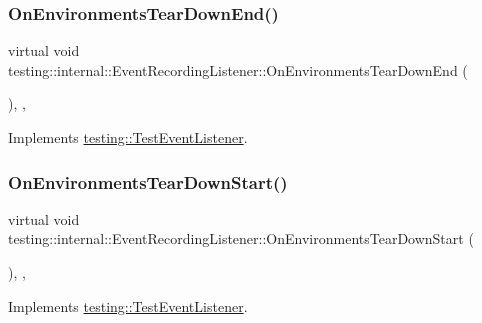 \subsubsection{\texorpdfstring{OnEnvironmentsTearDownEnd()}{OnEnvironmentsTearDownEnd()}}
{\footnotesize\ttfamily virtual void testing\+::internal\+::\+Event\+Recording\+Listener\+::\+On\+Environments\+Tear\+Down\+End (\begin{DoxyParamCaption}\item[{const \mbox{\hyperlink{classtesting_1_1UnitTest}{Unit\+Test}} \&}]{ }\end{DoxyParamCaption})\hspace{0.3cm}{\ttfamily [inline]}, {\ttfamily [protected]}, {\ttfamily [virtual]}}



Implements \mbox{\hyperlink{classtesting_1_1TestEventListener_a9ea04fa7f447865ba76df35e12ba2092}{testing\+::\+Test\+Event\+Listener}}.

\mbox{\label{classtesting_1_1internal_1_1EventRecordingListener_a17eebd7bb5cc6bab53b20794919ca5ae}} 
\subsubsection{\texorpdfstring{OnEnvironmentsTearDownStart()}{OnEnvironmentsTearDownStart()}}
{\footnotesize\ttfamily virtual void testing\+::internal\+::\+Event\+Recording\+Listener\+::\+On\+Environments\+Tear\+Down\+Start (\begin{DoxyParamCaption}\item[{const \mbox{\hyperlink{classtesting_1_1UnitTest}{Unit\+Test}} \&}]{ }\end{DoxyParamCaption})\hspace{0.3cm}{\ttfamily [inline]}, {\ttfamily [protected]}, {\ttfamily [virtual]}}



Implements \mbox{\hyperlink{classtesting_1_1TestEventListener_a468b5e6701bcb86cb2c956caadbba5e4}{testing\+::\+Test\+Event\+Listener}}.

\mbox{\label{classtesting_1_1internal_1_1EventRecordingListener_a4d0cb8a389c7339bce0aa6128291529f}} 
